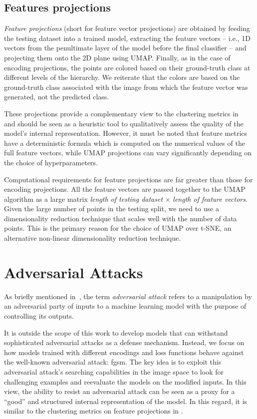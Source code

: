 \subsection{Features projections}
\label{subsec:features-projections}

\emph{Feature projections} (short for feature vector projections) are obtained by feeding the testing dataset into a trained model, extracting the feature vectors -- i.e., 1D vectors from the penultimate layer of the model before the final classifier -- and projecting them onto the 2D plane using UMAP. Finally, as in the case of encoding projections, the points are colored based on their ground-truth class at different levels of the hierarchy. We reiterate that the colors are based on the ground-truth class associated with the image from which the feature vector was generated, not the predicted class.

These projections provide a complementary view to the clustering metrics in~ and should be seen as a heuristic tool to qualitatively assess the quality of the model's internal representation. However, it must be noted that feature metrics have a deterministic formula which is computed on the numerical values of the full feature vectors, while UMAP projections can vary significantly depending on the choice of hyperparameters.

Computational requirements for feature projections are far greater than those for encoding projections. All the feature vectors are passed together to the UMAP algorithm as a large matrix \emph{length of testing dataset} $\times$ \emph{length of feature vectors}. Given the large number of points in the testing split, we need to use a dimensionality reduction technique that scales well with the number of data points. This is the primary reason for the choice of UMAP over t-SNE, an alternative non-linear dimensionality reduction technique.

\section{Adversarial Attacks}
\label{sec:adversarial-attacks-model-evaluation}

As briefly mentioned in~, the term \emph{adversarial attack} refers to a manipulation by an adversarial party of inputs to a machine learning model with the purpose of controlling its outputs.

It is outside the scope of this work to develop models that can withstand sophisticated adversarial attacks as a defense mechanism. Instead, we focus on how models trained with different encodings and loss functions behave against the well-known adversarial attack: \acrfull{fgsm}. The key idea is to exploit this adversarial attack's searching capabilities in the image space to look for challenging examples and reevaluate the models on the modified inputs. In this view, the ability to resist an adversarial attack can be seen as a proxy for a ``good'' and structured internal representation of the model. In this regard, it is similar to the clustering metrics on feature projections in .

